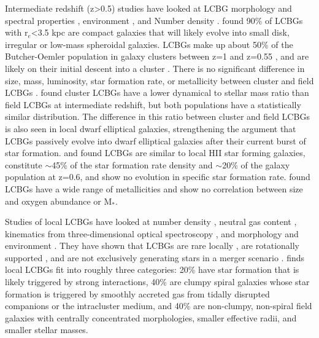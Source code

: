 \documentclass[manuscript]{aastex61}
\begin{document}
Intermediate redshift (z>0.5) studies have looked at LCBG morphology \citep{2006ApJ...640L.143N} and spectral properties \citep{2010ApJ...708.1076T}, environment \citep{2006ApJ...636L..13C,2014ApJ...786...30C,2016ApJ...817...87C,2017arXiv170604534R}, and  Number density \citep{1997ApJ...489..559G,1997ApJ...489..543P}. \citet{2006ApJ...640L.143N} found 90\% of LCBGs with r$_{e}$<3.5 kpc are compact galaxies that will likely evolve into small disk, irregular or low-mass spheroidal galaxies. LCBGs make up about 50\% of the Butcher-Oemler population in galaxy clusters between z=1 and z=0.55 \citep{2006ApJ...636L..13C}, and are likely on their initial descent into a cluster \citep{2014ApJ...786...30C}. There is no significant difference in size, mass, luminosity, star formation rate, or metallicity between cluster and field LCBGs \citep{2016ApJ...817...87C}. \citet{2017arXiv170604534R} found cluster LCBGs have a lower dynamical to stellar mass ratio than field LCBGs at intermediate redshift, but both populations have a statistically similar distribution. The difference in this ratio between cluster and field LCBGs is also seen in local dwarf elliptical galaxies, strengthening the argument that LCBGs passively evolve into dwarf elliptical galaxies after their current burst of star formation.  \citet{1997ApJ...489..559G} and \citet{1997ApJ...489..543P} found LCBGs are similar to local HII star forming galaxies, constitute $\sim$45\% of the star formation rate density and $\sim$20\% of the galaxy population at z=0.6, and show no evolution in specific star formation rate. \citet{2010ApJ...708.1076T} found LCBGs have a wide range of metallicities and show no correlation between size and oxygen abundance or M$_{*}$. 

Studies of local LCBGs have looked at number density \citep{2004ApJ...617.1004W}, neutral gas content \citep{2007ApJ...671..310G,2014arXiv1412.4739R}, kinematics from three-dimensional optical spectroscopy \citep{2011MNRAS.418.2350P}, and morphology and environment \citep{2015ApJ...807..134G}. They have shown that LCBGs are rare locally \citep{2004ApJ...617.1004W}, are rotationally supported \citep{2014arXiv1412.4739R, 2011MNRAS.418.2350P}, and are not exclusively generating stars in a merger scenario \citep{2014arXiv1412.4739R,2015ApJ...807..134G, 2011MNRAS.418.2350P}. \citet{2015ApJ...807..134G} finds local LCBGs fit into roughly three categories: 20\% have star formation that is likely triggered by strong interactions, 40\% are clumpy spiral galaxies whose star formation is triggered by smoothly accreted gas from tidally disrupted companions or the intracluster medium, and 40\% are non-clumpy, non-spiral field galaxies with centrally concentrated morphologies, smaller effective radii, and smaller stellar masses.
\end{document}
